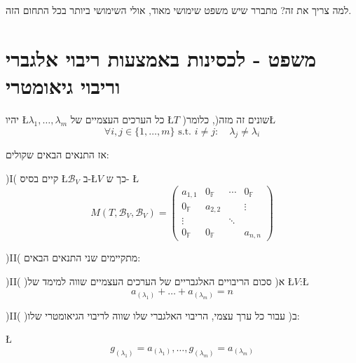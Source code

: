 \documentclass[english,hebrew]{article}
\begin{document}
למה צריך את זה? מתברר שיש משפט שימושי מאוד, אולי השימושי ביותר בכל
התחום הזה.

\section{משפט - לכסינות באמצעות ריבוי אלגברי וריבוי גיאומטרי}

יהיו \L{$\lambda_{1},\dots,\lambda_{m}$} כל הערכים העצמיים של \L{$T$}
)שונים זה מזה(, כלומר\L{%
\[
\forall i,j\in\{1,\dots,m\}\text{ s.t. }i\neq j:\quad\lambda_{j}\neq\lambda_{i}
\]
}%

אז התנאים הבאים שקולים:

)I( קיים בסיס \L{$\mathcal{B}_{V}$} ב-\L{$V$} כך ש- \L{%
\[
M(T,\mathcal{B}_{V},\mathcal{B}_{V})=\begin{pmatrix}a_{1,1} & 0_{\mathbb{F}} & \cdots & 0_{\mathbb{F}}\\
0_{\mathbb{F}} & a_{2,2} &  & \vdots\\
\vdots &  & \ddots\\
0_{\mathbb{F}} & 0_{\mathbb{F}} &  & a_{n,n}
\end{pmatrix}
\]
}%

)II( מתקיימים שני התנאים הבאים:

)II( )א( סכום הריבויים האלגבריים של הערכים העצמיים שווה למימד של \L{$V$}:\L{%
\[
a_{\left(\lambda_{1}\right)}+\dots+a_{\left(\lambda_{m}\right)}=n
\]
}%

)II( )ב( עבור כל ערך עצמי, הריבוי האלגברי שלו שווה לריבוי הגיאומטרי
שלו:

\L{%
\[
g_{\left(\lambda_{1}\right)}=a_{\left(\lambda_{1}\right)},\dots,g_{\left(\lambda_{m}\right)}=a_{\left(\lambda_{m}\right)}
\]
}%
\end{document}
